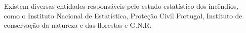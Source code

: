 \documentclass[a4paper,10pt]{article}
\title{}
\author{}
\date{}
\begin{document}
\maketitle

Existem diversas entidades responsáveis pelo estudo estatístico dos incêndios, como o Instituto Nacional de Estatística, Proteção Civil Portugal, Instituto de conservação da natureza e das florestas e G.N.R.
\end{document}

